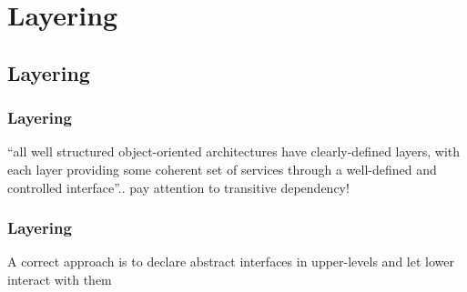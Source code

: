 \documentclass{beamer}
\begin{document}
\section{Layering}
\subsection{Layering}
\begin{frame}
	\frametitle{Layering}
	``all well structured object-oriented architectures have clearly-defined layers, with each layer providing some coherent set of services through a well-defined and controlled interface''.. pay attention to transitive dependency!
	\begin{center}
	\end{center}
\end{frame}

\begin{frame}
	\frametitle{Layering}
	A correct approach is to declare abstract interfaces in upper-levels and let lower interact with them
	\begin{center}
	\end{center}
\end{frame}
\end{document}
